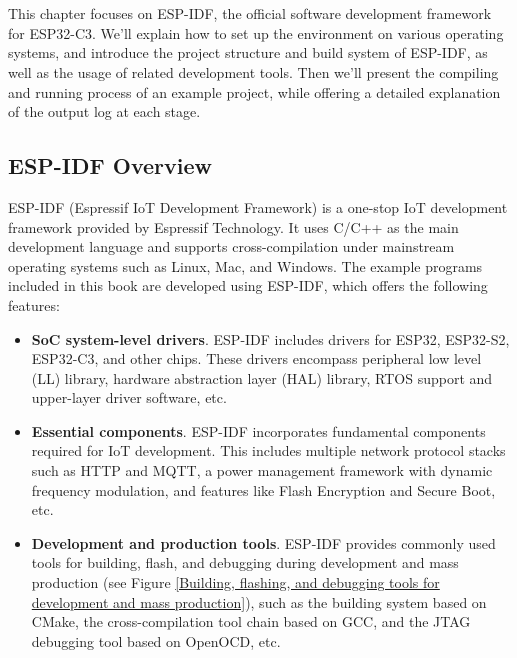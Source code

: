 \documentclass[a4paper,12pt]{book}
\begin{document}

\chapter[Setting Up Development Environment]{}

\vspace{36pt}
This chapter focuses on ESP-IDF, the official software development framework for ESP32-C3. We’ll explain how to set up the environment on various operating systems, and introduce the project structure and build system of ESP-IDF, as well as the usage of related development tools. Then we’ll present the compiling and running process of an example project, while offering a detailed explanation of the output log at each stage.

\section{ESP-IDF Overview}
ESP-IDF (Espressif IoT Development Framework) is a one-stop IoT development framework provided by Espressif Technology. It uses C/C++ as the main development language and supports cross-compilation under mainstream operating systems such as Linux, Mac, and Windows. The example programs included in this book are developed using ESP-IDF, which offers the following features:

\begin{itemize}[leftmargin=1.5em]
    \item \textbf{SoC system-level drivers}. ESP-IDF includes drivers for ESP32, ESP32-S2, ESP32-C3, and other chips. These drivers encompass peripheral low level (LL) library, hardware abstraction layer (HAL) library, RTOS support and upper-layer driver software, etc.
    \item \textbf{Essential components}. ESP-IDF incorporates fundamental components required for IoT development. This includes multiple network protocol stacks such as HTTP and MQTT, a power management framework with dynamic frequency modulation, and features like Flash Encryption and Secure Boot, etc.
    \item \textbf{Development and production tools}. ESP-IDF provides commonly used tools for building, flash, and debugging during development and mass production (see Figure \ref{Building, flashing, and debugging tools for development and mass production}), such as the building system based on CMake, the cross-compilation tool chain based on GCC, and the JTAG debugging tool based on OpenOCD, etc.
\end{itemize}
\end{document}

